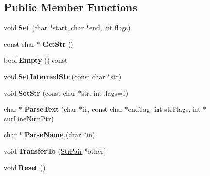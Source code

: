 \subsection*{Public Member Functions}
\begin{DoxyCompactItemize}
\item 
void {\bfseries Set} (char $\ast$start, char $\ast$end, int flags)\hypertarget{classtinyxml2_1_1StrPair_a4f05549373394266a1eecba26813c166}{}\label{classtinyxml2_1_1StrPair_a4f05549373394266a1eecba26813c166}

\item 
const char $\ast$ {\bfseries Get\+Str} ()\hypertarget{classtinyxml2_1_1StrPair_ad87e3d11330f5e689ba1e7e54c023b57}{}\label{classtinyxml2_1_1StrPair_ad87e3d11330f5e689ba1e7e54c023b57}

\item 
bool {\bfseries Empty} () const \hypertarget{classtinyxml2_1_1StrPair_affa1043e73a18f05d5d2faec055725a7}{}\label{classtinyxml2_1_1StrPair_affa1043e73a18f05d5d2faec055725a7}

\item 
void {\bfseries Set\+Interned\+Str} (const char $\ast$str)\hypertarget{classtinyxml2_1_1StrPair_a2baf6230e18333e02ab65d0897ee3941}{}\label{classtinyxml2_1_1StrPair_a2baf6230e18333e02ab65d0897ee3941}

\item 
void {\bfseries Set\+Str} (const char $\ast$str, int flags=0)\hypertarget{classtinyxml2_1_1StrPair_a1f82ec6b5bee35ee7466d8565e43b1de}{}\label{classtinyxml2_1_1StrPair_a1f82ec6b5bee35ee7466d8565e43b1de}

\item 
char $\ast$ {\bfseries Parse\+Text} (char $\ast$in, const char $\ast$end\+Tag, int str\+Flags, int $\ast$cur\+Line\+Num\+Ptr)\hypertarget{classtinyxml2_1_1StrPair_a68e6999b7677fa711287ececb9ba317e}{}\label{classtinyxml2_1_1StrPair_a68e6999b7677fa711287ececb9ba317e}

\item 
char $\ast$ {\bfseries Parse\+Name} (char $\ast$in)\hypertarget{classtinyxml2_1_1StrPair_aa6d8998efceba41d87ec2300c70a6085}{}\label{classtinyxml2_1_1StrPair_aa6d8998efceba41d87ec2300c70a6085}

\item 
void {\bfseries Transfer\+To} (\hyperlink{classtinyxml2_1_1StrPair}{Str\+Pair} $\ast$other)\hypertarget{classtinyxml2_1_1StrPair_a35f795b1557fe5fdcbd93d3cc5d6b939}{}\label{classtinyxml2_1_1StrPair_a35f795b1557fe5fdcbd93d3cc5d6b939}

\item 
void {\bfseries Reset} ()\hypertarget{classtinyxml2_1_1StrPair_a80c1b3bd99bf62ae85c94a29ce537125}{}\label{classtinyxml2_1_1StrPair_a80c1b3bd99bf62ae85c94a29ce537125}

\end{DoxyCompactItemize}
